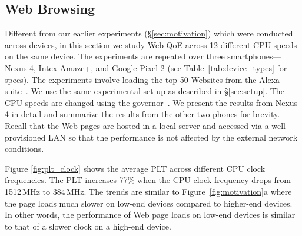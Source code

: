 
\subsection{Web Browsing} \label{label:web}


Different from our earlier experiments (\S\ref{sec:motivation}) which were conducted across devices, in this section we study Web QoE  across 12 different CPU speeds on the same device. The experiments are repeated over three smartphones---Nexus 4, Intex Amaze+, and Google Pixel 2 (see Table~\ref{tab:device_types} for specs). The experiments involve loading the top 50 Websites from the Alexa suite~\cite{alexa}.  We use the 
same experimental set up as described in \S\ref{sec:setup}. The CPU speeds are changed using the governor~\cite{ad-governors}. We present the results from Nexus\,4 in detail and summarize the results from the other two phones for brevity.
%
Recall that the Web pages are hosted in a local server and accessed via a well-provisioned LAN so that the performance is not affected by the external network conditions. 


Figure \ref{fig:plt_clock} shows the average PLT across different CPU clock frequencies. The PLT increases 77\% when the CPU clock frequency drops from 1512\,MHz to 384\,MHz. The trends are similar to Figure~\ref{fig:motivation}a where the page loads much slower on low-end devices compared to higher-end devices. In other words, the performance of Web page loads on low-end devices is similar to that of a slower clock on a high-end device. 

